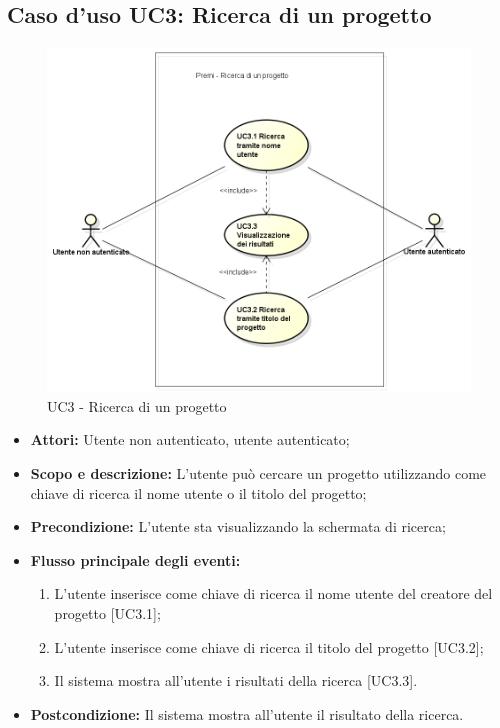 \subsection{Caso d'uso UC3: Ricerca di un progetto}
\begin{figure}[h] 
	\centering 
	\includegraphics[scale=0.45] {img/UC3.png} 
	\caption{UC3 - Ricerca di un progetto} 
\end{figure}

\begin{itemize}
	\item \textbf{Attori:} Utente non autenticato, utente autenticato;
	\item \textbf{Scopo e descrizione:} L'utente può cercare un progetto utilizzando come chiave di ricerca il nome utente o il titolo del progetto;
	\item \textbf{Precondizione:} L'utente sta visualizzando la schermata di ricerca;
	\item \textbf{Flusso principale degli eventi:}
	\begin{enumerate}
		\item L'utente inserisce come chiave di ricerca il nome utente del creatore del progetto [UC3.1];
		\item L'utente inserisce come chiave di ricerca il titolo del progetto [UC3.2];
		\item Il sistema mostra all'utente i risultati della ricerca [UC3.3].
	\end{enumerate}
	\item \textbf{Postcondizione:} Il sistema mostra all'utente il risultato della ricerca.
\end{itemize}

